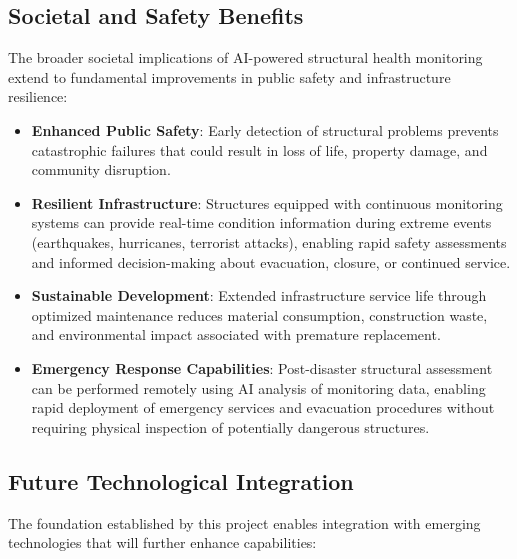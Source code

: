 \documentclass[11pt,a4paper]{article}
\begin{document}
\subsection{Societal and Safety Benefits}

The broader societal implications of AI-powered structural health monitoring extend to fundamental improvements in public safety and infrastructure resilience:

\begin{itemize}
    \item \textbf{Enhanced Public Safety}: Early detection of structural problems prevents catastrophic failures that could result in loss of life, property damage, and community disruption.
    
    \item \textbf{Resilient Infrastructure}: Structures equipped with continuous monitoring systems can provide real-time condition information during extreme events (earthquakes, hurricanes, terrorist attacks), enabling rapid safety assessments and informed decision-making about evacuation, closure, or continued service.
    
    \item \textbf{Sustainable Development}: Extended infrastructure service life through optimized maintenance reduces material consumption, construction waste, and environmental impact associated with premature replacement.
    
    \item \textbf{Emergency Response Capabilities}: Post-disaster structural assessment can be performed remotely using AI analysis of monitoring data, enabling rapid deployment of emergency services and evacuation procedures without requiring physical inspection of potentially dangerous structures.
\end{itemize}

\subsection{Future Technological Integration}

The foundation established by this project enables integration with emerging technologies that will further enhance capabilities:
\end{document}
